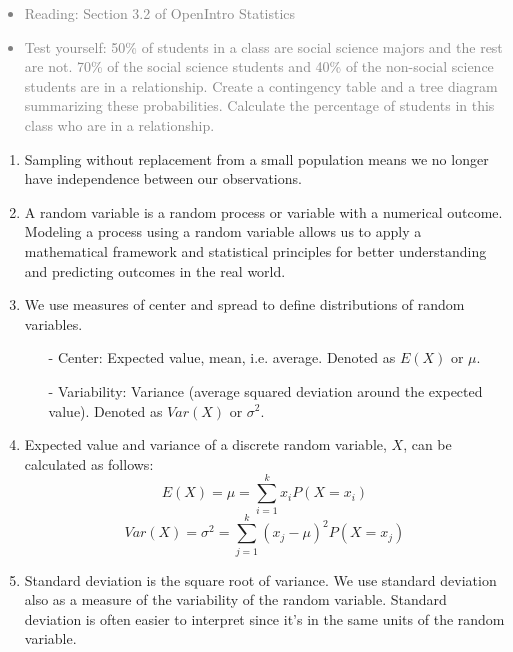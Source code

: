 \documentclass[11pt]{article}
\newcommand{\gray}[1]{\textcolor{gray}{#1}}
\begin{document}
\gray{
{\it
\vspace{-0.75cm}
\begin{itemize}
\renewcommand{\labelitemi}{{\textcolor{dark}{$\ast$}}}
\item Reading: Section 3.2 of OpenIntro Statistics
\item Test yourself: 50\% of students in a class are social science majors and the rest are not. 70\% of the social science students and 40\% of the non-social science students are in a relationship. Create a contingency table and a tree diagram summarizing these probabilities. Calculate the percentage of students in this class who are in a relationship.
\end{itemize}
}}

%

\begin{enumerate}[resume]
\renewcommand\labelenumi{\textcolor{light}{\textbf{LO \theenumi.}}}

\item Sampling without replacement from a small population means we no longer have independence between our observations.

\item A random variable is a random process or variable with a numerical outcome. Modeling a process using a random variable allows us to apply a mathematical framework and statistical principles for better understanding and predicting outcomes in the real world.

\item We use measures of center and spread to define distributions of random variables.
\begin{itemize}
\item[-] Center: Expected value, mean, i.e. average. Denoted as $E(X)$ or $\mu$.
\item[-] Variability: Variance (average squared deviation around the expected value). Denoted as $Var(X)$ or $\sigma^2$.
\end{itemize}

\item Expected value and variance of a discrete random variable, $X$, can be calculated as follows:
\[ E(X) = \mu = \sum_{i = 1}^k x_i P(X = x_i) \]
\[ Var(X) = \sigma^2 = \sum_{j = 1}^k (x_j - \mu)^2 P(X = x_j) \]

\item Standard deviation is the square root of variance. We use standard deviation also as a measure of the variability of the random variable. Standard deviation is often easier to interpret since it's in the same units of the random variable.


\end{enumerate}
\end{document}
